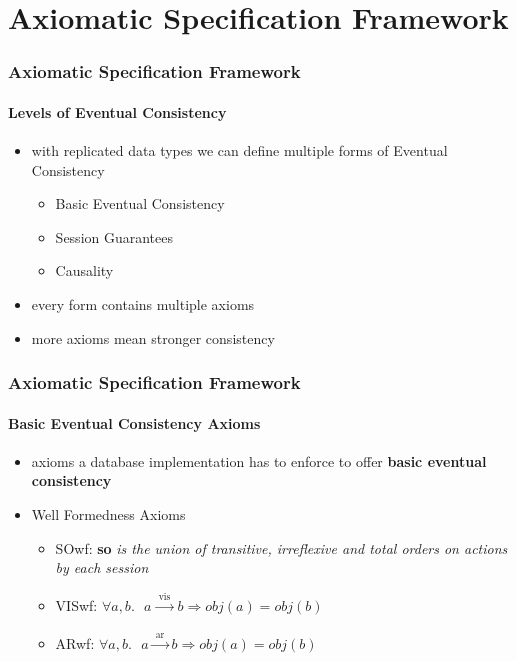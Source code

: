 \documentclass[11pt]{beamer}
\begin{document}
\section{Axiomatic Specification Framework}

\begin{frame}
\frametitle{Axiomatic Specification Framework}
\framesubtitle{Levels of Eventual Consistency}
\begin{itemize}
\item with replicated data types we can define multiple forms of Eventual Consistency
\begin{itemize}
\item Basic Eventual Consistency
\item Session Guarantees
\item Causality
\end{itemize}
\item every form contains multiple axioms
\item more axioms mean stronger consistency
\end{itemize}
\end{frame}

\begin{frame}
\frametitle{Axiomatic Specification Framework}
\framesubtitle{Basic Eventual Consistency Axioms}
\begin{itemize}
\item axioms a database implementation has to enforce to offer \textbf{basic eventual consistency} 
\item Well Formedness Axioms
\begin{itemize}
\item SOwf: \textbf{so} \textit{is the union of transitive, irreflexive and total orders
on actions by each session}
\item VISwf: \(\forall a,b. \text{ } a \xrightarrow[]{\text{ vis }}b \Rightarrow obj(a) = obj(b) \)
\item ARwf: \(\forall a,b. \text{ } a \xrightarrow[]{\text{ ar }} b \Rightarrow obj(a) = obj(b) \)
\end{itemize}
\end{itemize}
\end{frame}
\end{document}
